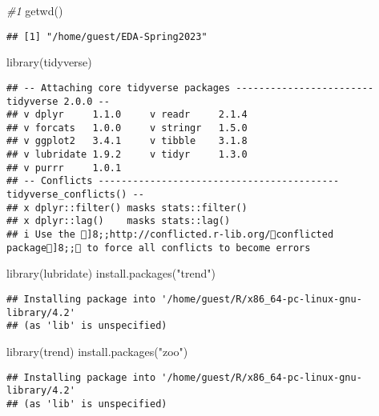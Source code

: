 \documentclass[
]{article}
\newenvironment{Shaded}{\begin{snugshade}}{\end{snugshade}}
\newcommand{\CommentTok}[1]{\textcolor[rgb]{0.56,0.35,0.01}{\textit{#1}}}
\newcommand{\FunctionTok}[1]{\textcolor[rgb]{0.00,0.00,0.00}{#1}}
\newcommand{\NormalTok}[1]{#1}
\newcommand{\StringTok}[1]{\textcolor[rgb]{0.31,0.60,0.02}{#1}}
\begin{document}
\begin{Shaded}
\begin{Highlighting}[]
\CommentTok{\#1}
\FunctionTok{getwd}\NormalTok{()}
\end{Highlighting}
\end{Shaded}

\begin{verbatim}
## [1] "/home/guest/EDA-Spring2023"
\end{verbatim}

\begin{Shaded}
\begin{Highlighting}[]
\FunctionTok{library}\NormalTok{(tidyverse)}
\end{Highlighting}
\end{Shaded}

\begin{verbatim}
## -- Attaching core tidyverse packages ------------------------ tidyverse 2.0.0 --
## v dplyr     1.1.0     v readr     2.1.4
## v forcats   1.0.0     v stringr   1.5.0
## v ggplot2   3.4.1     v tibble    3.1.8
## v lubridate 1.9.2     v tidyr     1.3.0
## v purrr     1.0.1     
## -- Conflicts ------------------------------------------ tidyverse_conflicts() --
## x dplyr::filter() masks stats::filter()
## x dplyr::lag()    masks stats::lag()
## i Use the ]8;;http://conflicted.r-lib.org/conflicted package]8;; to force all conflicts to become errors
\end{verbatim}

\begin{Shaded}
\begin{Highlighting}[]
\FunctionTok{library}\NormalTok{(lubridate)}
\FunctionTok{install.packages}\NormalTok{(}\StringTok{"trend"}\NormalTok{)}
\end{Highlighting}
\end{Shaded}

\begin{verbatim}
## Installing package into '/home/guest/R/x86_64-pc-linux-gnu-library/4.2'
## (as 'lib' is unspecified)
\end{verbatim}

\begin{Shaded}
\begin{Highlighting}[]
\FunctionTok{library}\NormalTok{(trend)}
\FunctionTok{install.packages}\NormalTok{(}\StringTok{"zoo"}\NormalTok{)}
\end{Highlighting}
\end{Shaded}

\begin{verbatim}
## Installing package into '/home/guest/R/x86_64-pc-linux-gnu-library/4.2'
## (as 'lib' is unspecified)
\end{verbatim}
\end{document}
